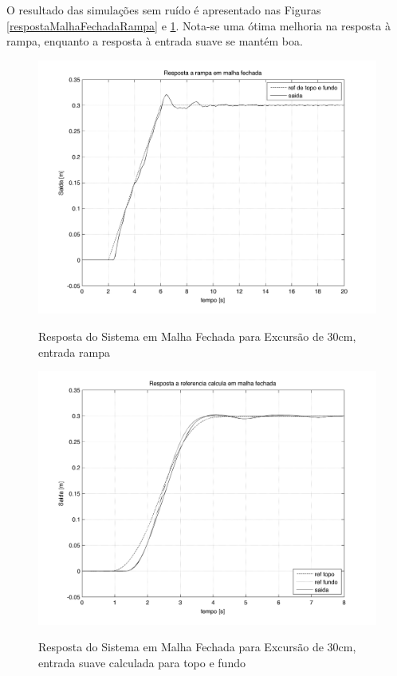  O resultado das simulações sem ruído é apresentado nas Figuras \ref{respostaMalhaFechadaRampa} e \ref{respostaMalhaFechadaRefTopoFundo}. Nota-se uma ótima melhoria na resposta à rampa, enquanto a resposta à entrada suave se mantém boa.


\begin{figure}[!htb]
    \centering
    \begin{minipage}{.45\textwidth}
        \centering
       
        \includegraphics[width=1\linewidth]{figs/resultados/simulacao/respostaMalhaFechadaRampa}
        \label{respostaMalhaFechadaRampa}
         \caption{Resposta do Sistema em Malha Fechada para Excursão de 30cm, entrada rampa}
    \end{minipage}%
    \hspace{0.1cm}
    \begin{minipage}{0.45\textwidth}
        \centering
      
        \includegraphics[width=1\linewidth]{figs/resultados/simulacao/respostaMalhaFechadaRefTopoFundo}
        \label{respostaMalhaFechadaRefTopoFundo}
        \caption{Resposta do Sistema em Malha Fechada para Excursão de 30cm, entrada suave calculada para topo e fundo}
    \end{minipage}
\end{figure}

